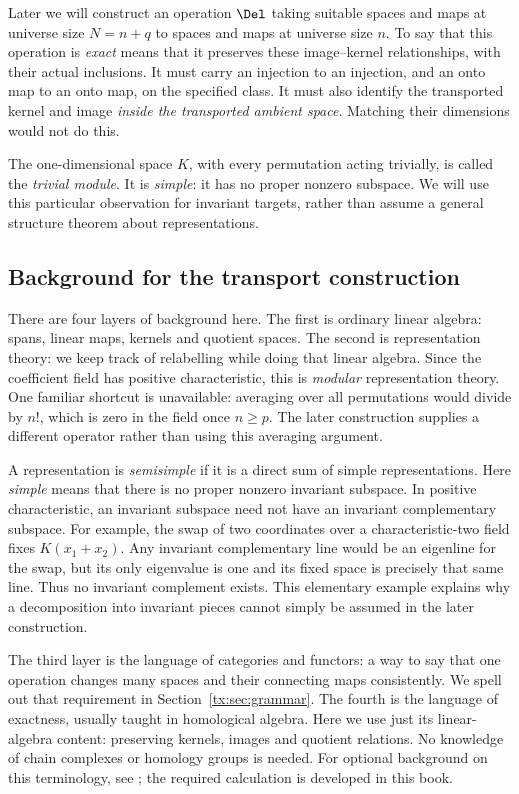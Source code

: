 Later we will construct an operation $\Del$ taking suitable spaces and
maps at universe size $N=n+q$ to spaces and maps at universe size $n$.
To say that this operation is \emph{exact} means that it preserves
these image--kernel relationships, with their actual inclusions.
It must carry an injection to an injection, and an onto map to an
onto map, on the specified class. It must also identify the transported
kernel and image \emph{inside the transported ambient space}.
Matching their dimensions would not do this.

The one-dimensional space $K$, with every permutation acting trivially,
is called the \emph{trivial module}. It is \emph{simple}: it has no
proper nonzero subspace. We will use this particular observation for
invariant targets, rather than assume a general structure theorem
about representations.

\subsection{Background for the transport construction}
There are four layers of background here. The first is ordinary
linear algebra: spans, linear maps, kernels and quotient spaces.
The second is representation theory: we keep track of relabelling
while doing that linear algebra. Since the coefficient field has
positive characteristic, this is \emph{modular} representation theory.
One familiar shortcut is unavailable: averaging over all permutations
would divide by $n!$, which is zero in the field once $n\ge p$.
The later construction supplies a different operator rather than
using this averaging argument.

A representation is \emph{semisimple} if it is a direct sum of simple
representations. Here \emph{simple} means that there is no proper
nonzero invariant subspace. In positive characteristic, an invariant subspace
need not have an invariant complementary subspace. For example, the
swap of two coordinates over a characteristic-two field fixes
$K(x_1+x_2)$. Any invariant complementary line would be an eigenline
for the swap, but its only eigenvalue is one and its fixed space is
precisely that same line. Thus no invariant complement exists.
This elementary example explains why a decomposition into invariant
pieces cannot simply be assumed in the later construction.

The third layer is the language of categories and functors: a way to
say that one operation changes many spaces and their connecting
maps consistently. We spell out that requirement in
Section~\ref{tx:sec:grammar}. The fourth is the language of exactness,
usually taught in homological algebra. Here we use just its
linear-algebra content: preserving kernels, images and quotient
relations. No knowledge of chain complexes or homology groups is
needed. For optional background on this terminology, see
\cite{StacksExact}; the required calculation is developed in this book.


